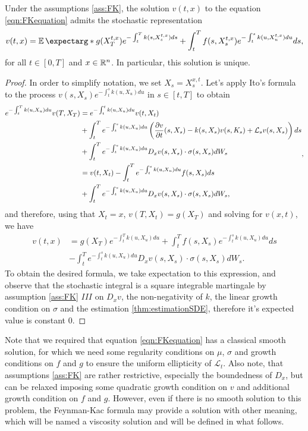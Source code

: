 \begin{theorem}
	\label{thm:LinearFK}
	Under the assumptions \ref{ass:FK}, the solution $v(t,x)$ to the equation \eqref{eqn:FKequation} admits the stochastic representation 
	\begin{equation}
		v(t,x)=\expect*{g(X_{T}^{t,x})e^{-\int_{t}^{T}k(s,X_{s}^{t,x})ds}+\int_{t}^{T}f(s,X_{s}^{t,x})e^{-\int_{t}^{s}k(u,X_{u}^{t,x})du}ds},
	\end{equation}
	 for all $t\in[0,T]$ and $x\in\mathbb{R}^n$. In particular, this solution is unique.
\end{theorem}
\begin{proof}
	In order to simplify notation, we set $X_s=X_{s}^{x,t}$. Let's apply Ito's formula to the process  $v(s,X_s)e^{-\int_{t}^{s}k(u,X_{u})du}$ in $s\in[t,T]$ to obtain
	\begin{equation}
		\begin{split}
		e^{-\int_{t}^{T}k(u,X_{u})du}v(T,X_T)&=e^{-\int_{t}^{t}k(u,X_{u})du}v(t,X_t)\\
		&+\int_{t}^{T}e^{-\int_{t}^{s}k(u,X_{u})du}\left(\frac{\partial v}{\partial t}(s,X_s)-k(s,X_s)v(s,K_s)+\mathcal{L}_s v(s,X_s)\right)ds\\
		&+\int_{t}^{T}e^{-\int_{t}^{s}k(u,X_{u})du}D_x v(s,X_s)\cdot \sigma(s,X_s)dW_s\\
		&=v(t,X_t)-\int_{t}^{T}e^{-\int_{t}^{s}k(u,X_{u})du}f(s,X_s)ds\\
		&+\int_{t}^{T}e^{-\int_{t}^{s}k(u,X_{u})du}D_x v(s,X_s)\cdot \sigma(s,X_s)dW_s,
		\end{split},
	\end{equation}
and therefore, using that $X_t=x$, $v(T,X_t)=g(X_T)$ and solving for $v(x,t)$, we have
\begin{equation}
	\begin{split}
		v(t,x)&=g(X_T)e^{-\int_{t}^{T}k(u,X_{u})du}+\int_{t}^{T}f(s,X_s)e^{-\int_{t}^{s}k(u,X_{u})du}ds\\
		&-\int_{t}^{T}e^{-\int_{t}^{s}k(u,X_{u})du}D_x v(s,X_s)\cdot \sigma(s,X_s)dW_s.
	\end{split}
\end{equation}
To obtain the desired formula, we take expectation to this expression, and observe that the stochastic integral is a square integrable martingale by assumption \ref{ass:FK} $III$ on $D_x v$, the non-negativity of $k$, the linear growth condition on $\sigma$ and the estimation \ref{thm:estimationSDE}, therefore it's expected value is constant $0$.
\end{proof}
Note that we required that equation \eqref{eqn:FKequation} has a classical smooth solution, for which we need some regularity conditions on $\mu$, $\sigma$ and growth conditions on $f$ and $g$ to ensure the uniform ellipticity of $\mathcal{L}_t$. Also note, that assumptions \ref{ass:FK} are rather restrictive, especially the boundedness of $D_x$, but can be relaxed imposing some quadratic growth condition on $v$ and additional growth condition on $f$ and $g$. However, even if there is no smooth solution to this problem, the Feynman-Kac formula may provide a solution with other meaning, which will be named a viscosity solution and will be defined in what follows.


